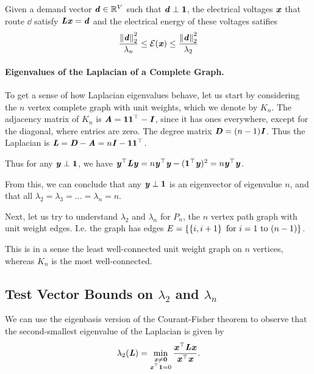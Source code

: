 \begin{claim}
  Given a demand vector
  $\boldsymbol{\mathit{d}} \in \mathbb{R}^V$ such that $\boldsymbol{\mathit{d}} \perp \boldsymbol{1}$,
  the electrical voltages $\boldsymbol{\mathit{x}}$ that route $\dd$ satisfy $\boldsymbol{\mathit{L}} \boldsymbol{\mathit{x}} =
  \boldsymbol{\mathit{d}}$ and the electrical energy of these voltages satifies
  \[
\frac{\left\| \boldsymbol{\mathit{d}} \right\|_2^2}{\lambda_n} \leq \mathcal{E}(\boldsymbol{\mathit{x}}) \leq \frac{\left\| \boldsymbol{\mathit{d}} \right\|_2^2}{\lambda_2}
    \]
\end{claim}


\paragraph{Eigenvalues of the Laplacian of a Complete Graph.}
To get a sense of how Laplacian eigenvalues behave, let us start by considering the $n$ vertex complete graph with unit weights,
which we denote by $K_n$.
The adjacency matrix of $K_n$ is $\boldsymbol{\mathit{A}} = \boldsymbol{1} \boldsymbol{1}^\top - \boldsymbol{\mathit{I}}$,
since it has ones everywhere, except for the diagonal, where entries
are zero.
The degree matrix $\boldsymbol{\mathit{D}} = (n-1) \boldsymbol{\mathit{I}}$.
Thus the Laplacian is $\boldsymbol{\mathit{L}} =  \boldsymbol{\mathit{D}} - \boldsymbol{\mathit{A}} = n\boldsymbol{\mathit{I}} - \boldsymbol{1}
\boldsymbol{1}^\top$.

Thus for any $\boldsymbol{\mathit{y}} \perp \boldsymbol{1}$, we have
$\boldsymbol{\mathit{y}}^{\top} \boldsymbol{\mathit{L}} \boldsymbol{\mathit{y}} = n \boldsymbol{\mathit{y}}^{\top} \boldsymbol{\mathit{y}} - (\boldsymbol{1}^{\top} \boldsymbol{\mathit{y}})^2 = n \boldsymbol{\mathit{y}}^{\top} \boldsymbol{\mathit{y}}$.

From this, we can conclude that any $\boldsymbol{\mathit{y}} \perp \boldsymbol{1}$ is an
eigenvector of eigenvalue $n$, and that all $\lambda_2 = \lambda_3 =
\ldots = \lambda_n = n$.

Next, let us try to understand $\lambda_2$ and $\lambda_n$ for
$P_n$, the $n$ vertex path graph with unit weight edges.
I.e. the graph has edges $E = \left\{ \left\{i,i+1 \right\}  \text{ for } i = 1 \text{ to
  } (n-1)  \right\}$.

This is in a sense the least well-connected unit weight graph on $n$
vertices, whereas $K_n$ is the most well-connected.

\subsection{Test Vector Bounds on $\lambda_2$ and $\lambda_n$}
We can use the eigenbasis version of the Courant-Fisher theorem to observe
that the second-smallest eigenvalue of the Laplacian is given by
\begin{align}
  \label{eq:lambda2bymin}
\lambda_2(\boldsymbol{\mathit{L}}) = \min_{ \substack{ \boldsymbol{\mathit{x}} \neq \boldsymbol{0} \\ \boldsymbol{\mathit{x}}^\top \boldsymbol{1} = 0} } \frac{ \boldsymbol{\mathit{x}}^\top \boldsymbol{\mathit{L}} \boldsymbol{\mathit{x}}}{ \boldsymbol{\mathit{x}}^\top \boldsymbol{\mathit{x}}}.
\end{align}

